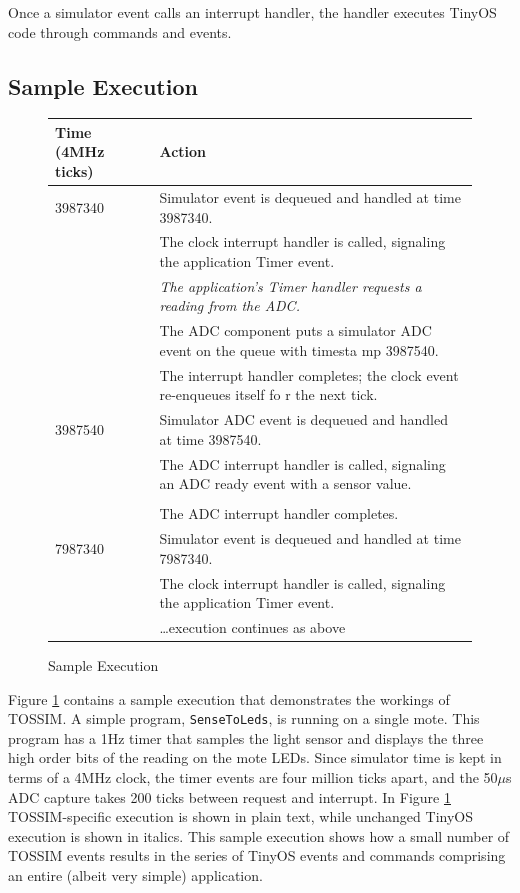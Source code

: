 \documentclass[10pt,fleqn]{article}
\def\sim{TOSSIM\xspace}
\def\mote{mote\xspace}
\begin{document}
Once a simulator event calls an interrupt handler, the handler
executes TinyOS code through commands and events.

\subsection{Sample Execution}

\begin{figure}
\scriptsize
\centering
\begin{tabular}{ll}
Time (4MHz ticks) & Action \\ \hline
3987340 & Simulator event is dequeued and handled at time 3987340.\\
        & The clock interrupt handler is called, signaling the application Timer
 event.\\
        & \hspace{0.2in} {\it The application's Timer handler requests a reading
 from the ADC.}\\
        & The ADC component puts a simulator ADC event on the queue with timesta
mp 3987540.\\
        & The interrupt handler completes; the clock event re-enqueues itself fo
r the next tick.\\

3987540 & Simulator ADC event is dequeued and handled at time 3987540.\\
        & The ADC interrupt handler is called, signaling an ADC ready event with
 a sensor value.\\
        & \hspace{0.2in}{\it The application event handler takes the top three b
its and calls LEDs commands.}\\
        & The ADC interrupt handler completes.\\

7987340 & Simulator event is dequeued and handled at time 7987340.\\
        & The clock interrupt handler is called, signaling the application Timer
 event.\\
        & \ldots execution continues as above
\end{tabular}
\caption{Sample Execution}
\label{fig:exec}
\end{figure}

Figure \ref{fig:exec} contains a sample execution that demonstrates
the workings of \sim. A simple program, {\tt SenseToLeds}, is running
on a single \mote. This program has a 1Hz timer that samples the light
sensor and displays the three high order bits of the reading on the
\mote LEDs. Since simulator time is kept in terms of a 4MHz clock, the
timer events are four million ticks apart, and the 50$\mu$s ADC
capture takes 200 ticks between request and interrupt. In Figure
\ref{fig:exec} \sim-specific
execution is shown in plain text, while unchanged TinyOS execution is
shown in italics. This sample execution shows how a small number of
\sim events results in the series of TinyOS events and commands
comprising an entire (albeit very simple) application.
\end{document}
